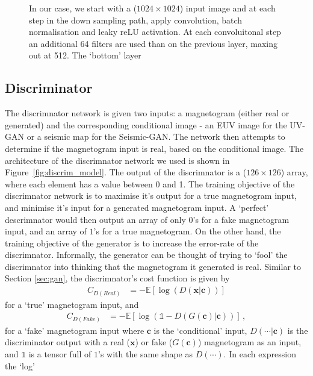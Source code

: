 \documentclass[11pt,a4paper,onecolumn]{report}
\begin{document}
  \begin{figure}
    \centering
    \caption{
      In our case, we start with a ($1024\times 1024$) input image and at each step
      in the down sampling path, apply convolution, batch normalisation and leaky
      reLU activation.%
      At each convoluitonal step an additional 64 filters are used than on the
      previous layer, maxing out at 512. The `bottom' layer 
    }
    \label{fig:gen_model}
  \end{figure}


\subsection{Discriminator}
The discrimnator network is given two inputs: a magnetogram (either real or
generated) and the corresponding conditional image - an EUV image for the UV-GAN
or a seismic map for the Seismic-GAN. The network then attempts to determine if
the magnetogram input is real, based on the conditional image. The architecture
of the discrimnator network we used is shown in Figure~\ref{fig:discrim_model}.
The output of the discrimnator is a ($126\times 126$) array, where each element
has a value between 0 and 1. The training objective of the discrimnator network
is to maximise it's output for a true magnetogram input, and minimise it's input
for a generated magnetogram input. A `perfect' descrimnator would then output an
array of only $0$'s for a fake magnetogram input, and an array of $1$'s for a
true magnetogram. On the other hand, the training objective of the generator is
to increase the error-rate of the discrimnator. Informally, the generator can be
thought of trying to `fool' the discrimnator into thinking that the magnetogram
it generated is real. Similar to Section \ref{sec:gan}, the discrimnator's cost
function is given by
\begin{align}
  C_{D(Real)} &= -\mathds{E}\left[\log(D(\mathbf{x}|\mathbf{c}))\right]
\end{align}
for a `true' magnetogram input, and
\begin{align}
  C_{D(Fake)} &=  -\mathds{E}\left[\log(\mathds{1} -  D(G(\mathbf{c})|\mathbf{c}) ) \right]\,,
\end{align}
for a `fake' magnetogram input where $\mathbf{c}$ is the `conditional' input,
$D(\dotsb|\mathbf{c})$ is the discriminator output with a real ($\mathbf{x}$) or
fake ($G(\mathbf{c})$) magnetogram as an input, and $\mathds{1}$ is a tensor
full of $1$'s with the same shape as $D(\dotsb)$. In each expression the `log'
\end{document}
